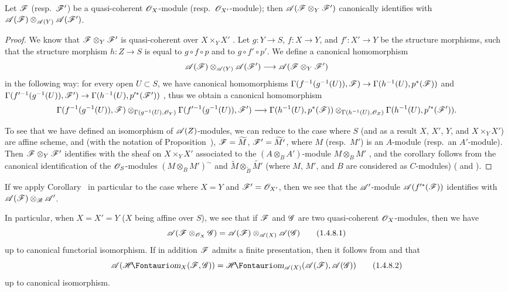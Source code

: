 \begin{corollary}[1.4.7]
\label{II.1.4.7}
Let $\mathscr{F}$ (resp.~$\mathscr{F}'$) be a quasi-coherent $\mathscr{O}_X$-module (resp.~$\mathscr{O}_{X'}$-module); then $\mathscr{A}(\mathscr{F}\otimes_Y\mathscr{F}')$ canonically identifies with $\mathscr{A}(\mathscr{F})\otimes_{\mathscr{A}(Y)}\mathscr{A}(\mathscr{F}')$.
\end{corollary}

\begin{proof}
We know that $\mathscr{F}\otimes_Y\mathscr{F}'$ is quasi-coherent over $X\times_Y X'$ .
Let $g:Y\to S$, $f:X\to Y$, and $f':X'\to Y$ be the structure morphisms, such that the structure morphism
$h:Z\to S$ is equal to $g\circ f\circ p$ and to $g\circ f'\circ p'$.
We define a canonical homomorphism
\[
  \sh{A}(\sh{F})\otimes_{\sh{A}(Y)}\sh{A}(\sh{F}')\to\sh{A}(\sh{F}\otimes_Y\sh{F}')
\]
in the following way: for every open $U\subset S$, we have canonical homomorphisms $\Gamma(f^{-1}(g^{-1}(U)),\sh{F})\to\Gamma(h^{-1}(U),p^*(\sh{F}))$ and $\Gamma(f^{\prime-1}(g^{-1}(U)),\sh{F}')\to\Gamma(h^{-1}(U),p^{\prime*}(\sh{F}'))$ , thus we obtain a canonical homomorphism
\[
  \Gamma(f^{-1}(g^{-1}(U)),\sh{F})\otimes_{\Gamma(g^{-1}(U),\sh{O}_Y)}\Gamma(f^{\prime-1}(g^{-1}(U)),\sh{F}')\to\Gamma(h^{-1}(U),p^*(\sh{F}))\otimes_{\Gamma(h^{-1}(U),\sh{O}_Z)}\Gamma(h^{-1}(U),p^{\prime*}(\sh{F}')).
\]

To see that we have defined an isomorphism of $\mathscr{A}(Z)$-modules, we can reduce to the case where $S$ (and as a result $X$, $X'$, $Y$, and $X\times_Y X'$) are affine scheme, and (with the notation of Proposition~), $\mathscr{F}=\widetilde{M}$, $\mathscr{F}'=\widetilde{M'}$, where $M$ (resp.~$M'$) is an $A$-module (resp.~an $A'$-module).
Then $\mathscr{F}\otimes_Y\mathscr{F}'$ identifies with the sheaf on $X\times_Y X'$ associated to the $(A\otimes_B A')$-module $M\otimes_B M'$ , and the corollary follows from the canonical identification of the $\mathscr{O}_S$-modules $(M\otimes_B M')^\sim$ and $\widetilde{M}\otimes_{\widetilde{B}}\widetilde{M'}$ (where $M$, $M'$, and $B$ are considered as $C$-modules) ( and ).
\end{proof}

If we apply Corollary~ in particular to the case where $X=Y$ and $\mathscr{F}'=\mathscr{O}_{X'}$, then we see that the $\mathscr{A}'$-module $\mathscr{A}(f^{\prime*}(\mathscr{F}))$ identifies with $\mathscr{A}(\mathscr{F})\otimes_\mathscr{B}\mathscr{A}'$.

\begin{env}[1.4.8]
\label{II.1.4.8}
In particular, when $X=X'=Y$ ($X$ being affine over $S$), we see that if $\mathscr{F}$ and $\mathscr{G}$ are two quasi-coherent $\mathscr{O}_X$-modules, then we have
\[
\label{II.1.4.8.1}
  \mathscr{A}(\mathscr{F}\otimes_{\mathscr{O}_X}\mathscr{G})=\mathscr{A}(\mathscr{F})\otimes_{\mathscr{A}(X)}\mathscr{A}(\mathscr{G})
  \tag{1.4.8.1}
\]
up to canonical functorial isomorphism.
If in addition $\mathscr{F}$ admits a finite presentation, then it follows from  and  that
\[
\label{II.1.4.8.2}
  \sh{A}(\shHom_X(\sh{F},\sh{G}))=\shHom_{\sh{A}(X)}(\sh{A}(\sh{F}),\sh{A}(\sh{G}))
  \tag{1.4.8.2}
\]
up to canonical isomorphism.
\end{env}

